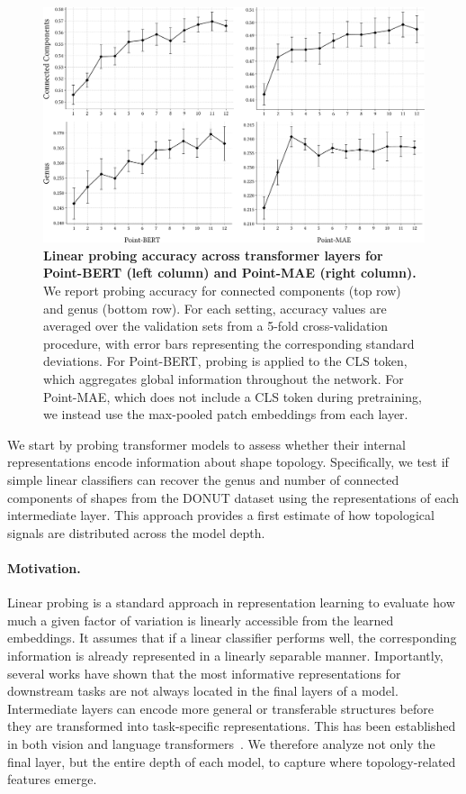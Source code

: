 \begin{figure}[h]
  \centering
  \includegraphics[width=\linewidth]{figs/probing.pdf}
  \caption{\textbf{Linear probing accuracy across transformer layers for Point-BERT (left column) and Point-MAE (right column).} We report probing accuracy for connected components (top row) and genus (bottom row). For each setting, accuracy values are averaged over the validation sets from a 5-fold cross-validation procedure, with error bars representing the corresponding standard deviations. For Point-BERT, probing is applied to the CLS token, which aggregates global information throughout the network. For Point-MAE, which does not include a CLS token during pretraining, we instead use the max-pooled patch embeddings from each layer.}
  \label{fig:probing-results}
\end{figure}

We start by probing transformer models to assess whether their internal representations encode information about shape topology. Specifically, we test if simple linear classifiers can recover the genus and number of connected components of shapes from the DONUT dataset using the representations of each intermediate layer. This approach provides a first estimate of how topological signals are distributed across the model depth.

\paragraph{Motivation.}
Linear probing is a standard approach in representation learning to evaluate how much a given factor of variation is linearly accessible from the learned embeddings. It assumes that if a linear classifier performs well, the corresponding information is already represented in a linearly separable manner. Importantly, several works have shown that the most informative representations for downstream tasks are not always located in the final layers of a model. Intermediate layers can encode more general or transferable structures before they are transformed into task-specific representations. This has been established in both vision and language transformers~\cite{intermediate_layers, structural_probe, vit_probing}. We therefore analyze not only the final layer, but the entire depth of each model, to capture where topology-related features emerge.

